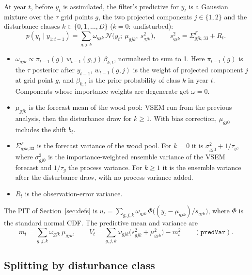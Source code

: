 \documentclass[11pt]{article}
\newcommand{\code}[1]{\texttt{#1}}
\begin{document}
At year $t$, before $y_t$ is assimilated, the filter's predictive for $y_t$ is a Gaussian
mixture over the $\tau$ grid points $g$, the two projected components $j \in \{1, 2\}$ and the
disturbance classes $k \in \{0, 1, \dots, D\}$ ($k = 0$: undisturbed):
\begin{equation}
  p(y_t \mid y_{1:t-1}) = \sum_{g,j,k} \omega_{gjk}\,
  \mathcal{N}\!\big(y_t;\ \mu_{gjk},\ s^2_{gjk}\big),
  \qquad
  s^2_{gjk} = \Sigma^F_{gjk,33} + R_t .
  \label{eq:pred}
\end{equation}
\begin{itemize}
  \item $\omega_{gjk} \propto \pi_{t-1}(g)\, w_{t-1}(g,j)\, \beta_{k,t}$, normalised to sum to 1.
  Here $\pi_{t-1}(g)$ is the $\tau$ posterior after $y_{t-1}$, $w_{t-1}(g,j)$ is the weight of
  projected component $j$ at grid point $g$, and $\beta_{k,t}$ is the prior probability of class
  $k$ in year $t$. Components whose importance weights are degenerate get $\omega = 0$.
  \item $\mu_{gjk}$ is the forecast mean of the wood pool: VSEM run from the previous analysis,
  then the disturbance draw for $k \ge 1$. With bias correction, $\mu_{gj0}$ includes the
  shift $b_t$.
  \item $\Sigma^F_{gjk,33}$ is the forecast variance of the wood pool. For $k = 0$ it is
  $\sigma^2_{gj0} + 1/\tau_g$, where $\sigma^2_{gj0}$ is the importance-weighted ensemble
  variance of the VSEM forecast and $1/\tau_g$ the process variance. For $k \ge 1$ it is the ensemble
  variance after the disturbance draw, with no process variance added.
  \item $R_t$ is the observation-error variance.
\end{itemize}
The PIT of Section~\ref{sec:defs} is $u_t = \sum_{g,j,k} \omega_{gjk}\,\Phi\big((y_t - \mu_{gjk})/s_{gjk}\big)$,
where $\Phi$ is the standard normal CDF. The predictive mean and variance are
\begin{equation}
  m_t = \sum_{g,j,k} \omega_{gjk}\,\mu_{gjk}, \qquad
  V_t = \sum_{g,j,k} \omega_{gjk}\big(s^2_{gjk} + \mu^2_{gjk}\big) - m_t^2
  \qquad (\code{predVar}).
  \label{eq:V}
\end{equation}

\subsection{Splitting by disturbance class}
\label{sec:split}
\end{document}
